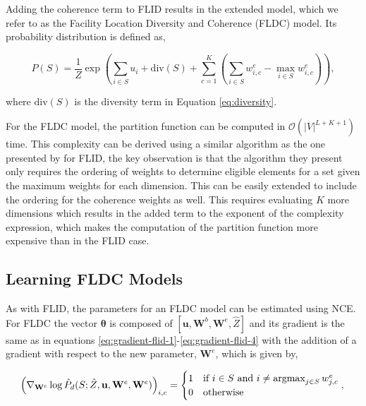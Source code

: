 Adding the coherence term to FLID results in the extended model, which we refer to as the Facility Location Diversity and Coherence (FLDC) model. Its probability distribution is defined as,

\begin{equation}
  \tag{FLDC}
  P(S) = \frac{1}{Z}\exp{\left(\sum_{i \in S}{u_{i}} + \mathrm{div}(S) + \sum_{c=1}^{K}{\left(\sum_{i \in S}{w^{e}_{i,c}} - \max_{i \in S}{w^{e}_{i,c}}\right)}\right)},
  \label{eq:fldc}
\end{equation}

where $\mathrm{div}(S)$ is the diversity term in Equation \eqref{eq:diversity}.

For the FLDC model, the partition function can be computed in $\mathcal{O}(|V|^{L+K+1})$ time. This complexity can be derived using a similar algorithm as the one presented by \citet{tschiatschek16learning} for FLID, the key observation is that the algorithm they present only requires the ordering of weights to determine eligible elements for a set given  the maximum weights for each dimension. This can be easily extended to include the ordering for the coherence weights as well. This requires evaluating $K$ more dimensions which results in the added term to the exponent of the complexity expression, which makes the computation of the partition function more expensive than in the FLID case.

\subsection{Learning FLDC Models}

As with FLID, the parameters for an FLDC model can be estimated using NCE. For FLDC the vector $\boldsymbol{\theta}$ is composed of $[\mathbf{u}, \mathbf{W}^{b}, \mathbf{W}^{e}, \hat{Z}]$ and its gradient is the same as in equations \eqref{eq:gradient-flid-1}-\eqref{eq:gradient-flid-4} with the addition of a gradient with respect to the new parameter, $\mathbf{W}^{e}$, which is given by,

\begin{equation}
\left(\nabla_{\mathbf{W}^{e}}\log{\hat{P}_{d}(S; \hat{Z}, \mathbf{u}, \mathbf{W}^{e}, \mathbf{W}^{e})}\right)_{i,c} = \begin{cases}
1 & \text{if}\ i \in S\ \text{and}\ i \neq \operatorname*{argmax}_{j \in S}{w^{e}_{j,c}} \\
0 & \text{otherwise}
\end{cases}, \label{eq:sub-fldc}\\
\end{equation}

